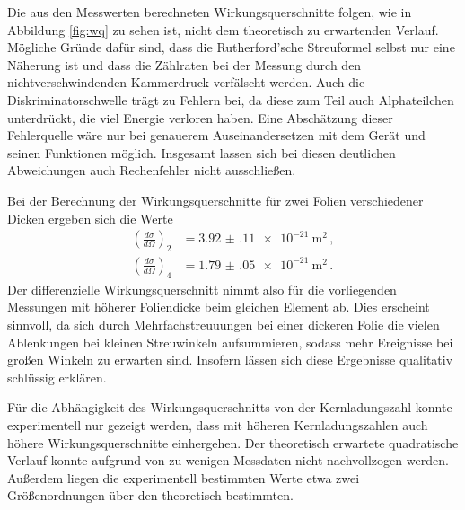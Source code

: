 Die aus den Messwerten berechneten Wirkungsquerschnitte folgen, wie in Abbildung
\ref{fig:wq} zu sehen ist, nicht dem theoretisch zu erwartenden Verlauf. Mögliche Gründe
dafür sind, dass die Rutherford'sche Streuformel selbst nur eine Näherung ist und
dass die Zählraten bei der Messung durch den nichtverschwindenden Kammerdruck
verfälscht werden. Auch die Diskriminatorschwelle trägt zu Fehlern bei, da diese zum Teil auch Alphateilchen unterdrückt, die viel Energie verloren haben. Eine Abschätzung dieser Fehlerquelle wäre nur bei genauerem Auseinandersetzen mit dem Gerät und seinen Funktionen möglich. Insgesamt lassen sich bei diesen deutlichen Abweichungen auch Rechenfehler nicht ausschließen.

Bei der Berechnung der Wirkungsquerschnitte für zwei Folien verschiedener Dicken
ergeben sich die Werte
\begin{align*}
  \left(\frac{d \sigma}{d \Omega}\right)_2&=\SI{3.92(11)e-21}{\metre\squared} \,, \\
  \left(\frac{d \sigma}{d \Omega}\right)_4&=\SI{1.79(05)e-21}{\metre\squared} \,.
\end{align*}
Der differenzielle Wirkungsquerschnitt nimmt also für die vorliegenden Messungen mit höherer Foliendicke beim gleichen Element ab. Dies erscheint sinnvoll, da sich durch Mehrfachstreuuungen bei einer dickeren Folie die vielen Ablenkungen bei kleinen Streuwinkeln aufsummieren, sodass mehr Ereignisse bei großen Winkeln zu erwarten sind. Insofern lässen sich diese Ergebnisse qualitativ schlüssig erklären.

Für die Abhängigkeit des Wirkungsquerschnitts von der Kernladungszahl konnte experimentell
nur gezeigt werden, dass mit höheren Kernladungszahlen auch höhere Wirkungsquerschnitte
einhergehen. Der theoretisch erwartete quadratische Verlauf konnte aufgrund von zu
wenigen Messdaten nicht nachvollzogen werden. Außerdem liegen die experimentell
bestimmten Werte etwa zwei Größenordnungen über den theoretisch bestimmten.


%
%
%
%
%
